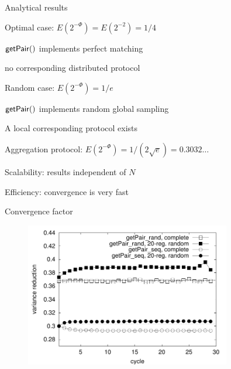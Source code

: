 \begin{frame}{Analytical results}
\BIL
\item \alert{Optimal case}: $E(2^{-\Phi}) = E(2^{-2}) = 1/4$
\BI
\item $\mathsf{getPair}()$ implements perfect matching
\item no corresponding distributed protocol
\EI
\item \alert{Random case}: $E(2^{-\Phi}) = 1/e$
\BI
\item $\mathsf{getPair}()$ implements random global sampling
\item A local corresponding protocol exists
\EI
\item \alert{Aggregation protocol}: $E(2^{-\Phi}) = 1/(2\sqrt{e}) = 0.3032\ldots$ 
\BI
\item Scalability: results independent of $N$
\item Efficiency: convergence is very fast
\EI
\EIL

\end{frame}

\begin{frame}{Convergence factor}

\begin{figure}
	\includegraphics[width=0.80\textwidth]{rate-100000}
\end{figure}

\end{frame}

